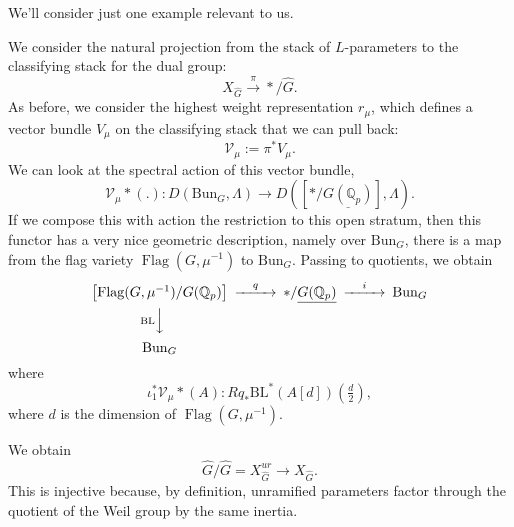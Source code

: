 \documentclass[reqno]{amsart} 
\begin{document}
We'll consider just one example relevant to us.
\begin{example}
  We consider the natural projection from the stack of $L$-parameters to the classifying stack for the dual group:
  \begin{equation*}
    X_{\hat{G}} \xrightarrow{\pi} \ast / \hat{G}.
  \end{equation*}
  As before, we consider the highest weight representation $r_\mu$, which defines a vector bundle $V_\mu$ on the classifying stack that we can pull back:
  \begin{equation*}
    \mathcal{V}_\mu := \pi^\ast V_\mu.
  \end{equation*}
  We can look at the spectral action of this vector bundle,
  \begin{equation*}
    \mathcal{V}_\mu \ast(.) : D \left( \mathrm{Bun}_G, \Lambda \right)
    \rightarrow D \left( [\ast / \underline{G(\mathbb{Q}_p)}], \Lambda \right).
  \end{equation*}
  If we compose this with action the restriction to this open stratum, then this functor has a very nice geometric description, namely over $\mathrm{Bun}_G$, there is a map from the flag variety $\operatorname{Flag}(G, \mu^{-1})$ to $\mathrm{Bun }_G$.  Passing to quotients, we obtain
  \begin{equation*}
    \begin{CD}         
      \left[ \operatorname{Flag}(G, \mu^{-1}) / G(\mathbb{Q}_p) \right] @>q>> \ast / \underline{G(\mathbb{Q}_p)}  @>i>> \mathrm{Bun}_{G}\\
      @V \mathrm{B L}VV  @. \\
      \mathrm{Bun}_G   @.\\
    \end{CD}
  \end{equation*}
  where
  \begin{equation*}
    \iota_1^\ast \mathcal{V}_\mu \ast(A) :   R q_\ast \mathrm{B L}^\ast \left( A[d] \right)
    \left( \tfrac{d}{2} \right),
  \end{equation*}
  where $d$ is the dimension of $\operatorname{Flag}(G, \mu^{-1})$.
\end{example}

We obtain
\begin{equation*}
  \hat{G} / \hat{G} = X_{\hat{G}}^{ur} \rightarrow X_{\hat{G}}.
\end{equation*}
This is injective because, by definition, unramified parameters factor through the quotient of the Weil  group by the same inertia.
\end{document}
